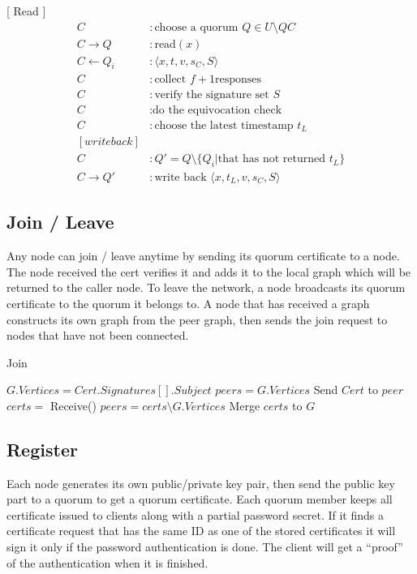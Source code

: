 \documentclass[twoside,twocolumn,10pt,fleqn]{article}
\begin{document}
[ Read ]
\setcounter{equation}{0}
\begin{align*}
  C &: \text{choose a quorum } Q \in U \setminus QC \\
  C \rightarrow Q &: \text{read}(x) \\
  C \leftarrow Q_i &: \langle x, t, v, s_C, S \rangle \\
  C &: \text{collect } f + 1 \text{responses} \\
  C &: \text{verify the signature set $S$} \\
  C &: \text{do the equivocation check} \\
  C &: \text{choose the latest timestamp } t_L \\
  [ write back ] \\
  C &: Q' = Q \setminus \{Q_i | \text{that has not returned } t_L\} \\
  C \rightarrow Q' &: \text{write back } \langle x, t_L, v, s_C, S \rangle
\end{align*}


\subsection{Join / Leave}
Any node can join / leave anytime by sending its quorum certificate to
a node. The node received the cert verifies it and adds it to the
local graph which will be returned to the caller node. To leave the
network, a node broadcasts its quorum certificate to the quorum it
belongs to.
A node that has received a graph constructs its own graph from the
peer graph, then sends the join request to nodes that have not been
connected.

\begin{algorithm}
  \caption{Join}
  \SetAlgoNoLine
  $G.Vertices = Cert.Signatures[].Subject$\;
  $peers = G.Vertices$\;
  {
    {
      Send $Cert$ to $peer$\;
      $certs = $ Receive()\;
      $peers = certs \setminus G.Vertices$\;
      Merge $certs$ to $G$\;
    }
  }
\end{algorithm}

\subsection{Register}
\label{register}
Each node generates its own public/private key pair, then send the
public key part to a quorum to get a quorum certificate. Each quorum
member keeps all certificate issued to clients along with a partial
password secret. If it finds a certificate request that has the same
ID as one of the stored certificates it will sign it only if the
password authentication is done. The client will get a ``proof'' of
the authentication when it is finished.
\end{document}
